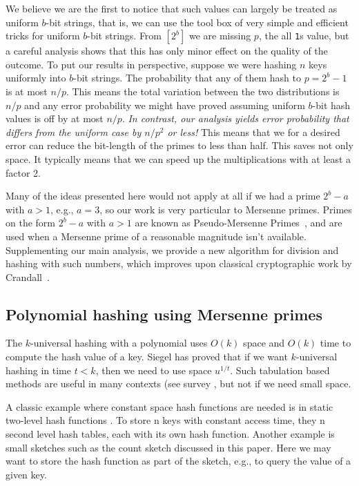 We believe we are the first to notice that such values
can largely be treated as uniform $b$-bit strings, that is, we can use
the tool box of very simple and efficient tricks for uniform
$b$-bit strings.
From $[2^b]$ we are missing $p$, the all \texttt1s value, but a careful analysis shows that this has only minor effect on the quality of the outcome.
To put our results in perspective, suppose we were hashing $n$ keys uniformly into $b$-bit strings.
The probability that any of them hash to $p=2^b-1$ is at most $n/p$.
This means the total variation between the two distributions is $n/p$ and any error probability we might have proved assuming uniform $b$-bit hash values is off by at most $n/p$.
\emph{In contrast, our analysis yields error probability that differs from the uniform case by $n/p^2$ or less!}
This means that we for a desired error can reduce the bit-length of the primes to less than half. This saves not only space. It typically means that we can speed up the multiplications with at least a factor 2.

Many of the ideas presented here would not apply at all if we had a prime $2^b-a$ with $a>1$, e.g., $a=3$, so our work is very particular to Mersenne primes.
Primes on the form $2^b-a$ with $a>1$ are known as Pseudo-Mersenne Primes~\cite{van2014encyclopedia}, and are used when a Mersenne prime of a reasonable magnitude isn't available.
Supplementing our main analysis, we provide a new algorithm for division and hashing with such numbers, which improves upon classical cryptographic work by Crandall~\cite{crandall1992method}.


\subsection{Polynomial hashing using Mersenne primes}

The $k$-universal hashing with a polynomial uses $O(k)$ space and $O(k)$ time
to compute the hash value of a key. Siegel \cite{Siegel04} has proved that if we want $k$-universal hashing in time $t<k$, then we need to use space $u^{1/t}$.
Such tabulation based methods are useful in many contexts (see survey \cite{Thorup17}, but not if we need small space.

A classic example where constant space hash functions are needed is in static two-level hash functions \cite{FKS84}.
To store n keys with constant access time, they n second level hash tables, each with its own  hash function.
Another example is small sketches such as the count sketch \cite{XXX} discussed in this paper. Here we may want to store the hash function as part of the sketch, e.g., to query the value of a given key.



